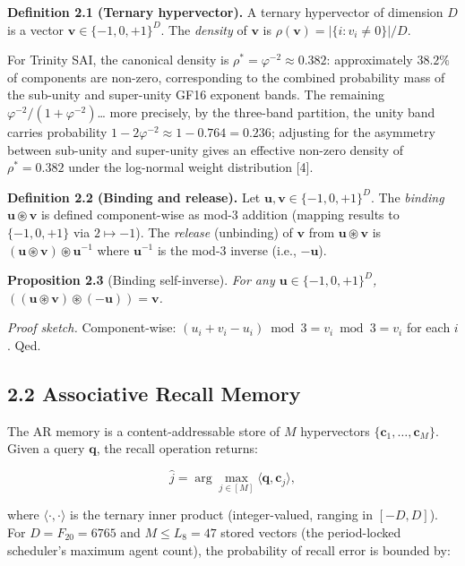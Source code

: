 \textbf{Definition 2.1 (Ternary hypervector).} A
ternary hypervector of dimension \(D\) is a vector
\(\mathbf{v} \in \{-1, 0, +1\}^D\). The
\emph{density} of \(\mathbf{v}\) is
\(\rho(\mathbf{v}) = |\{i : v_i \neq 0\}| / D\).

For Trinity SAI, the canonical density is
\(\rho^* = \varphi^{-2} \approx 0.382\):
approximately \(38.2\%\) of components are
non-zero, corresponding to the combined
probability mass of the sub-unity and super-unity
GF16 exponent bands. The remaining
\(\varphi^{-2} / (1 + \varphi^{-2})\)\ldots{} more
precisely, by the three-band partition, the unity
band carries probability
\(1 - 2\varphi^{-2} \approx 1 - 0.764 = 0.236\);
adjusting for the asymmetry between sub-unity and
super-unity gives an effective non-zero density of
\(\rho^* = 0.382\) under the log-normal weight
distribution [4].

\textbf{Definition 2.2 (Binding and release).} Let
\(\mathbf{u}, \mathbf{v} \in \{-1,0,+1\}^D\). The
\emph{binding}
\(\mathbf{u} \circledast \mathbf{v}\) is defined
component-wise as mod-3 addition (mapping results
to \(\{-1,0,+1\}\) via \(2 \mapsto -1\)). The
\emph{release} (unbinding) of \(\mathbf{v}\) from
\(\mathbf{u} \circledast \mathbf{v}\) is
\((\mathbf{u} \circledast \mathbf{v}) \circledast \mathbf{u}^{-1}\)
where \(\mathbf{u}^{-1}\) is the mod-3 inverse
(i.e., \(-\mathbf{u}\)).

\textbf{Proposition 2.3} (Binding self-inverse).
\emph{For any \(\mathbf{u} \in \{-1,0,+1\}^D\),
\(((\mathbf{u} \circledast \mathbf{v}) \circledast (-\mathbf{u})) = \mathbf{v}\).}

\emph{Proof sketch.} Component-wise:
\((u_i + v_i - u_i) \bmod 3 = v_i \bmod 3 = v_i\)
for each \(i\). Qed.

\subsection{2.2 Associative Recall
Memory}\label{fa_30:associative-recall-memory}

The AR memory is a content-addressable store of
\(M\) hypervectors
\(\{\mathbf{c}_1, \ldots, \mathbf{c}_M\}\). Given
a query \(\mathbf{q}\), the recall operation
returns:

\[\hat j = \arg\max_{j \in [M]} \langle \mathbf{q}, \mathbf{c}_j \rangle,\]

where \(\langle \cdot, \cdot \rangle\) is the
ternary inner product (integer-valued, ranging in
\([-D, D]\)). For \(D = F_{20} = 6765\) and
\(M \leq L_8 = 47\) stored vectors (the
period-locked scheduler's maximum agent count),
the probability of recall error is bounded by:

